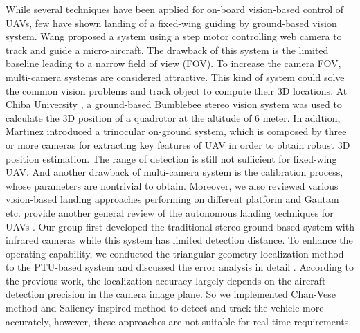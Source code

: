\documentclass[journal,article,submit,moreauthors,pdftex,10pt,a4paper]{mdpi}
\begin{document}
%
While several techniques have been applied for on-board vision-based control of UAVs, few have shown landing of a fixed-wing guiding by ground-based vision system. Wang \cite{Wang2006} proposed a system using a step motor controlling web camera to track and guide a micro-aircraft. The drawback of this system is the limited baseline leading to a narrow field of view (FOV). To increase the camera FOV, multi-camera systems are considered attractive. This kind of system could solve the common vision problems and track object to compute their 3D locations. At Chiba University \cite{pebrianti2010autonomous}, a ground-based Bumblebee stereo vision system was used to calculate the 3D position of a quadrotor at the altitude of 6 meter. 
%
In addtion, Martinez \cite{Martinez2009a} introduced a trinocular on-ground system, which is composed by three or more cameras for extracting key features of UAV in order to obtain robust 3D position estimation. The range of detection is still not sufficient for fixed-wing UAV. And another drawback of multi-camera system is the calibration process, whose parameters are nontrivial to obtain. Moreover, we also reviewed various vision-based landing approaches performing on different platform \cite{kong2014vision} and Gautam etc. provide another general review of the autonomous landing techniques for UAVs \cite{Gautam2014}.
%
Our group first developed the traditional stereo ground-based system with infrared cameras \cite{kong2013autonomous} while this system has limited detection distance. To enhance the operating capability, we conducted the triangular geometry localization method to the PTU-based system and discussed the error analysis in detail \cite{kong2014ground}. According to the previous work, the localization accuracy largely depends on the aircraft detection precision in the camera image plane. So we implemented Chan-Vese method \cite{tang2016ground} and Saliency-inspired method \cite{ma2016stereo} to detect and track the vehicle more accurately, however, these approaches are not suitable for real-time requirements.
\end{document}
